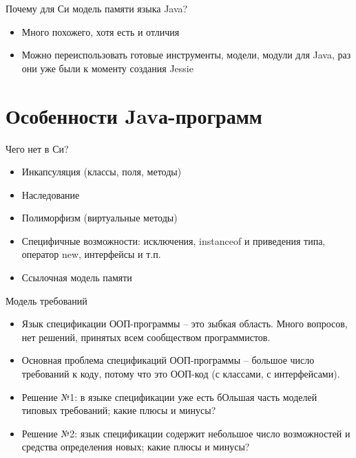 \documentclass[hyperref={unicode=true}]{beamer}
\begin{document}
    \begin{frame}{Почему для Си модель памяти языка Java?}
    \begin{itemize}
    \item
    Много похожего, хотя есть и отличия
    \item
    Можно переиспользовать готовые инструменты, модели,
    модули для Java, раз они уже были к моменту создания Jessie
    \end{itemize}
    \end{frame}

    \section{Особенности Javа-программ}

    \begin{frame}{Чего нет в Си?}
    \begin{itemize}
    \item
    Инкапсуляция (классы, поля, методы)
    \item
    Наследование
    \item
    Полиморфизм (виртуальные методы)
    \item
    Специфичные возможности: исключения, instanceof
    и приведения типа, оператор new, интерфейсы и т.п.
    \item
    Ссылочная модель памяти
    \end{itemize}
    \end{frame}

    \begin{frame}{Модель требований}
    \begin{itemize}
    \item
    Язык спецификации ООП-программы -- это
    зыбкая область. Много вопросов, нет решений,
    принятых всем сообществом программистов.
    \item
    Основная проблема спецификаций ООП-программы --
    большое число требований к коду, потому что
    это ООП-код (с классами, с интерфейсами).
    \item
    Решение №1: в языке спецификации уже есть
    бОльшая часть моделей типовых требований; какие
    плюсы и минусы?
    \item
    Решение №2: язык спецификации содержит небольшое
    число возможностей и средства определения новых;
    какие плюсы и минусы?
    \end{itemize}
    \end{frame}
\end{document}
